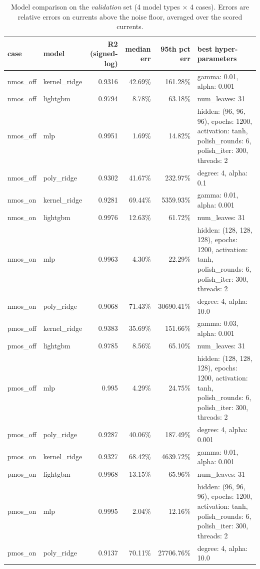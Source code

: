 \begin{table}[H]
\centering
{\small
\begin{tabular}{llrrrl}
\toprule
case & model & R2 (signed-log) & median err & 95th pct err & best hyper-parameters \\
\midrule
nmos\_off & kernel\_ridge & 0.9316 & 42.69\% & 161.28\% & gamma: 0.01, alpha: 0.001 \\
nmos\_off & lightgbm & 0.9794 & 8.78\% & 63.18\% & num\_leaves: 31 \\
nmos\_off & mlp & 0.9951 & 1.69\% & 14.82\% & hidden: (96, 96, 96), epochs: 1200, activation: tanh, polish\_rounds: 6, polish\_iter: 300, threads: 2 \\
nmos\_off & poly\_ridge & 0.9302 & 41.67\% & 232.97\% & degree: 4, alpha: 0.1 \\
nmos\_on & kernel\_ridge & 0.9281 & 69.44\% & 5359.93\% & gamma: 0.01, alpha: 0.001 \\
nmos\_on & lightgbm & 0.9976 & 12.63\% & 61.72\% & num\_leaves: 31 \\
nmos\_on & mlp & 0.9963 & 4.30\% & 22.29\% & hidden: (128, 128, 128), epochs: 1200, activation: tanh, polish\_rounds: 6, polish\_iter: 300, threads: 2 \\
nmos\_on & poly\_ridge & 0.9068 & 71.43\% & 30690.41\% & degree: 4, alpha: 10.0 \\
pmos\_off & kernel\_ridge & 0.9383 & 35.69\% & 151.66\% & gamma: 0.03, alpha: 0.001 \\
pmos\_off & lightgbm & 0.9785 & 8.56\% & 65.10\% & num\_leaves: 31 \\
pmos\_off & mlp & 0.995 & 4.29\% & 24.75\% & hidden: (128, 128, 128), epochs: 1200, activation: tanh, polish\_rounds: 6, polish\_iter: 300, threads: 2 \\
pmos\_off & poly\_ridge & 0.9287 & 40.06\% & 187.49\% & degree: 4, alpha: 0.001 \\
pmos\_on & kernel\_ridge & 0.9327 & 68.42\% & 4639.72\% & gamma: 0.01, alpha: 0.001 \\
pmos\_on & lightgbm & 0.9968 & 13.15\% & 65.96\% & num\_leaves: 31 \\
pmos\_on & mlp & 0.9995 & 2.04\% & 12.16\% & hidden: (96, 96, 96), epochs: 1200, activation: tanh, polish\_rounds: 6, polish\_iter: 300, threads: 2 \\
pmos\_on & poly\_ridge & 0.9137 & 70.11\% & 27706.76\% & degree: 4, alpha: 10.0 \\
\bottomrule
\end{tabular}
}
\caption{Model comparison on the \emph{validation} set (4 model types $\times$ 4 cases). Errors are relative errors on currents above the noise floor, averaged over the scored currents.}
\label{tab:comparison}
\end{table}

